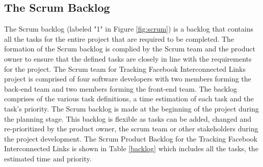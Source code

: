 \documentclass[12pt,onecolumn]{article}
\begin{document}
	\subsection{The Scrum Backlog } \label{scrumback}
	The Scrum backlog (labeled "1" in Figure \ref{fig:scrum}) is a backlog that contains all the tasks for the entire project that are required to be completed. The formation of the Scrum backlog is complied by the Scrum team and the product owner to ensure that the defined tasks are closely in line with the requirements for the project. The Scrum team for Tracking Facebook Interconnected Links project is comprised of four software developers with two members forming the back-end team and two members forming the front-end team. The backlog comprises of the various task definitions, a time estimation of each task and the task's priority. The Scrum backlog is made at the beginning of the project during the planning stage. This backlog is flexible as tasks can be added, changed and re-prioritized by the product owner, the scrum team or other stakeholders during the project development. The Scrum Product Backlog for the Tracking Facebook Interconnected Links is shown in Table \ref{backlog} which includes all the tasks, the estimated time and priority.     
	
\end{document}
